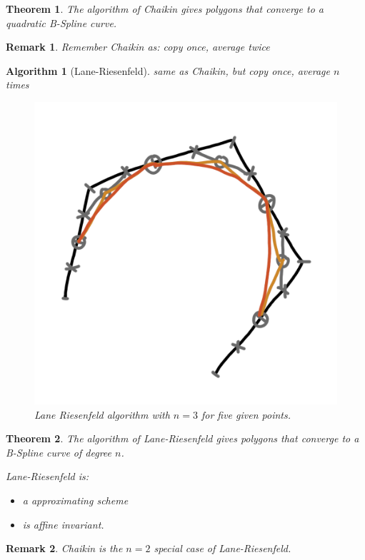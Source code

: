 \documentclass[]{article}
\newtheorem{theorem}{Theorem}
\newtheorem{algorithm}{Algorithm}
\newtheorem{remark}{Remark}
\begin{document}
\begin{theorem}
	The algorithm of Chaikin gives polygons that converge to a quadratic B-Spline curve.
\end{theorem}

\begin{remark}
	Remember Chaikin as: copy once, average twice
\end{remark}

\begin{algorithm}[Lane-Riesenfeld]
	same as Chaikin, but copy once, average $n$ times
	
	\begin{figure}[h!]
		\centering
		\includegraphics[width=0.3\linewidth]{figures/lane_riesenfeld}
		\caption{Lane Riesenfeld algorithm with $n=3$ for five given points.}
		\label{fig:lane_riesenfeld}
	\end{figure}
\end{algorithm}

\begin{theorem}
	The algorithm of Lane-Riesenfeld gives polygons that converge to a B-Spline curve of degree $n$.
	
	Lane-Riesenfeld is:
	\begin{itemize}
		\item a approximating scheme
		\item is affine invariant.
	\end{itemize}
\end{theorem}

\begin{remark}
	Chaikin is the $n=2$ special case of Lane-Riesenfeld.
\end{remark}
\end{document}
